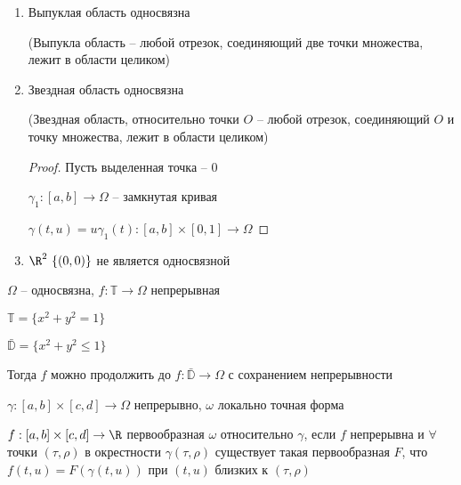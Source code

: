 \begin{example}\thmslashn
	
	\begin{enumerate}
		\item 
		Выпуклая область односвязна 
		
		(Выпукла область -- любой отрезок, соединяющий две точки множества, лежит в области целиком)
		
		\item
		Звездная область односвязна
		
		(Звездная область, относительно точки $O$ -- любой отрезок, соединяющий $O$ и точку множества, лежит в области целиком)
		
		\begin{proof}\thmslashn
			
			Пусть выделенная точка -- $0$
			
			$\gamma_1:[a, b] \to \Omega$ -- замкнутая кривая
			
			$\gamma(t, u) = u\gamma_1(t):[a, b]\times[0,1]\to \Omega$
			
		\end{proof}
		
		\item
		$\R^2 \ \{(0, 0)\} $ не является односвязной
		
	\end{enumerate}
	
\end{example}

\begin{exerc}\thmslashn
	
	$\Omega$ -- односвязна, $f:\mathbb{T} \to \Omega$ непрерывная
	
	$\mathbb{T} = \{x^2 + y^2 = 1\}$
	
	$\bar{\mathbb{D}} = \{x^2 + y^2 \leqslant 1\}$
	
	Тогда $f$ можно продолжить до $f:\bar{\mathbb{D}}\to \Omega$ с сохранением непрерывности
	
\end{exerc}

\begin{definition}\thmslashn
	
	$\gamma:[a,b] \times[c, d] \to \Omega$ непрерывно, $\omega$ локально точная форма
	
	$f:[a, b]\times[c, d] \to \R$ первообразная $\omega$ относительно $\gamma$, если $f$ непрерывна и $\forall$ точки $(\tau, \rho)$ в окрестности $\gamma(\tau, \rho)$  существует такая первообразная $F$, что $f(t, u) = F(\gamma(t, u))$ при $(t, u)$ близких к $(\tau, \rho)$
	
\end{definition}

